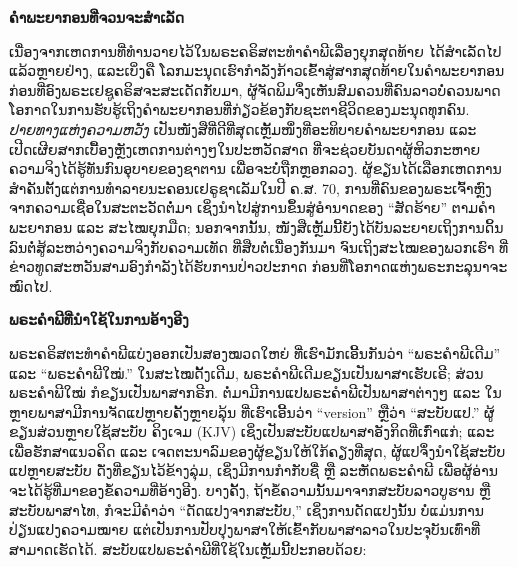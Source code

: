 
\textbf{ຄຳພະຍາກອນທີ່ຈວນຈະສຳເລັດ}

ເນື່ອງຈາກເຫດການທີ່ທຳນວາຍໄວ້ໃນພຣະຄຣິສຕະທຳຄຳພີເລື່ອງຍຸກສຸດທ້າຍ ໄດ້ສຳເລັດໄປແລ້ວຫຼາຍຢ່າງ, ແລະເບິ່ງຄື ໂລກມະນຸດເຮົາກຳລັງກ້າວເຂົ້າສູ່ສາກສຸດທ້າຍໃນຄຳພະຍາກອນ ກ່ອນທີ່ອົງພຣະເຢຊູຄຣິສຈະສະເດັດກັບມາ, ຜູ້ຈັດພິມຈຶ່ງເຫັນສົມຄວນທີ່ຄົນລາວບໍ່ຄວນພາດໂອກາດໃນການຮັບຮູ້ເຖິງຄຳພະຍາກອນທີ່ກ່ຽວຂ້ອງກັບຊະຕາຊີວິດຂອງມະນຸດທຸກຄົນ. \emph{ປາຍທາງແຫ່ງຄວາມຫວັງ} ເປັນໜັງສືທີ່ດີທີ່ສຸດເຫຼັ້ມໜຶ່ງທີ່ອະທິບາຍຄຳພະຍາກອນ ແລະ ເປີດເຜີຍສາກເບື້ອງຫຼັງເຫດການຕ່າງໆໃນປະຫວັດສາດ ທີ່ຈະຊ່ວຍບັນດາຜູ້ຫິວກະຫາຍຄວາມຈິງໄດ້ຮູ້ທັນກົນອຸບາຍຂອງຊາຕານ ເພື່ອຈະບໍ່ຖືກຫຼອກລວງ. ຜູ້ຂຽນໄດ້ເລືອກເຫດການສຳຄັນຕັ້ງແຕ່ການທຳລາຍນະຄອນເຢຣູຊາເລັມໃນປີ ຄ.ສ. 70, ການທີ່ຄົນຂອງພຣະເຈົ້າຫຼົງຈາກຄວາມເຊື່ອໃນສະຕະວັດຕໍ່ມາ ເຊິ່ງນຳໄປສູ່ການຂຶ້ນສູ່ອຳນາດຂອງ “ສັດຮ້າຍ” ຕາມຄຳພະຍາກອນ ແລະ ສະໄໝຍຸກມືດ; ນອກຈາກນັ້ນ, ໜັງສືເຫຼັ້ມນີ້ຍັງໄດ້ບັນລະຍາຍເຖິງການດິ້ນລົນຕໍ່ສູ້ລະຫວ່າງຄວາມຈິງກັບຄວາມເທັດ ທີ່ສືບຕໍ່ເນື່ອງກັນມາ ຈົນເຖິງສະໄໝຂອງພວກເຮົາ ທີ່ຂ່າວທູດສະຫວັນສາມອົງກຳລັງໄດ້ຮັບການປ່າວປະກາດ ກ່ອນທີ່ໂອກາດແຫ່ງພຣະກະລຸນາຈະໝົດໄປ.

\textbf{ພຣະຄຳພີທີ່ນຳໃຊ້ໃນການອ້າງອີງ}

ພຣະຄຣິສຕະທຳຄຳພີແບ່ງອອກເປັນສອງໝວດໃຫຍ່ ທີ່ເຮົາມັກເອີ້ນກັນວ່າ “ພຣະຄຳພີເດີມ” ແລະ “ພຣະຄຳພີໃໝ່.” ໃນສະໄໝດັ້ງເດີມ, ພຣະຄຳພີເດີມຂຽນເປັນພາສາເຮັບເຣີ; ສ່ວນພຣະຄຳພີໃໝ່ ກໍຂຽນເປັນພາສາກຣີກ. ຕໍ່ມາມີການແປພຣະຄຳພີເປັນພາສາຕ່າງໆ ແລະ ໃນຫຼາຍພາສາມີການຈັດແປຫຼາຍຄັ້ງຫຼາຍລຸ້ນ ທີ່ເຮົາເອີ້ນວ່າ “version” ຫຼືວ່າ “ສະບັບແປ.” ຜູ້ຂຽນສ່ວນຫຼາຍໃຊ້ສະບັບ ຄິງເຈມ (KJV) ເຊິ່ງເປັນສະບັບແປພາສາອັງກິດທີ່ເກົ່າແກ່; ແລະເພື່ອຮັກສາແນວຄິດ ແລະ ເຈດຕະນາລົມຂອງຜູ້ຂຽນໃຫ້ໃກ້ຄຽງທີ່ສຸດ, ຜູ້ແປຈຶ່ງນຳໃຊ້ສະບັບແປຫຼາຍສະບັບ ດັ່ງທີ່ຂຽນໄວ້ຂ້າງລຸ່ມ, ເຊິ່ງມີການກຳກັບຊື່ ຫຼື ລະຫັດພຣະຄຳພີ ເພື່ອຜູ້ອ່ານຈະໄດ້ຮູ້ທີ່ມາຂອງຂໍ້ຄວາມທີ່ອ້າງອີງ. ບາງຄັ້ງ, ຖ້າຂໍ້ຄວາມນັ້ນມາຈາກສະບັບລາວບູຮານ ຫຼື ສະບັບພາສາໄທ, ກໍຈະມີຄຳວ່າ “ດັດແປງຈາກສະບັບ,” ເຊິ່ງການດັດແປງນັ້ນ ບໍ່ແມ່ນການປ່ຽນແປງຄວາມໝາຍ ແຕ່ເປັນການປັບປຸງພາສາໃຫ້ເຂົ້າກັບພາສາລາວໃນປະຈຸບັນເທົ່າທີ່ສາມາດເຮັດໄດ້. ສະບັບແປພຣະຄຳພີທີ່ໃຊ້ໃນເຫຼັ້ມນີ້ປະກອບດ້ວຍ:

\newpage

